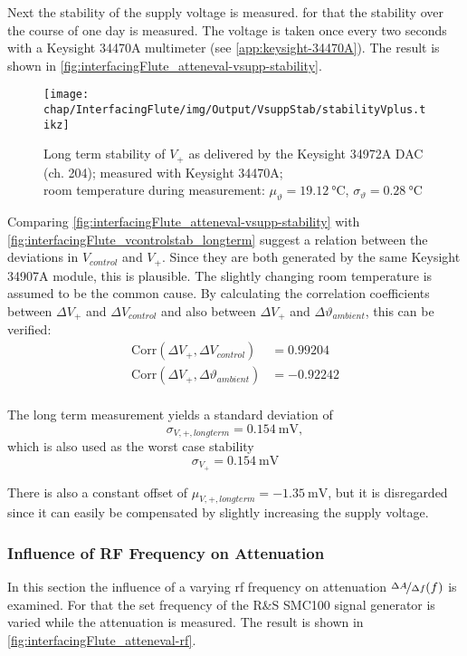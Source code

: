 Next the stability of the supply voltage is measured.
for that the stability over the course of one day is measured. The voltage is taken once every two seconds with a Keysight 34470A multimeter (see \autoref{app:keysight-34470A}). The result is shown in \autoref{fig:interfacingFlute_atteneval-vsupp-stability}.

\begin{figure}[tb]
	\centering
	\texttt{[image: chap/InterfacingFlute/img/Output/VsuppStab/stabilityVplus.tikz]}
	\caption{Long term stability of $V_{+}$ as delivered by the Keysight 34972A DAC (ch. 204); measured with Keysight 34470A;\\room temperature during measurement: $\mu_\vartheta=\SI{19.12}{\degreeCelsius}$, $\sigma_\vartheta=\SI{0.28}{\degreeCelsius}$}
	\label{fig:interfacingFlute_atteneval-vsupp-stability}
\end{figure}

Comparing \autoref{fig:interfacingFlute_atteneval-vsupp-stability} with \autoref{fig:interfacingFlute_vcontrolstab_longterm} suggest a relation between the deviations in $V_{control}$ and $V_+$. Since they are both generated by the same Keysight 34907A module, this is plausible. The slightly changing room temperature is assumed to be the common cause.
By calculating the correlation coefficients between $\Delta V_+$ and $\Delta V_{control}$ and also between $\Delta V_+$ and $\Delta \vartheta_{ambient}$, this can be verified:
\begin{align}
\text{Corr}(\Delta V_+,\Delta V_{control})         &= \num{0.99204} \\
\text{Corr}(\Delta V_+,\Delta \vartheta_{ambient}) &= \num{-0.92242} \\
\end{align}

The long term measurement yields a standard deviation of
\begin{equation}
\sigma_{V,+,longterm} = \SI{0.154}{\milli\volt},
\end{equation}
which is also used as the worst case stability
\begin{equation}
\sigma_{V_+} = \SI{0.154}{\milli\volt}
\end{equation}

There is also a constant offset of $\mu_{V,+,longterm}=\SI{-1.35}{\milli\volt}$, but it is disregarded since it can easily be compensated by slightly increasing the supply voltage.

\subsubsection{Influence of RF Frequency on Attenuation}
In this section the influence of a varying \gls{rf} frequency on attenuation $\nicefrac{\Delta A}{\Delta f} (f)$ is examined. For that the set frequency of the R\&S SMC100 signal generator is varied while the attenuation is measured. The result is shown in \autoref{fig:interfacingFlute_atteneval-rf}.

